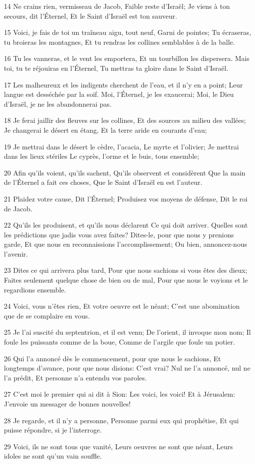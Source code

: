 \par 14 Ne crains rien, vermisseau de Jacob, Faible reste d'Israël; Je viens à ton secours, dit l'Éternel, Et le Saint d'Israël est ton sauveur.
\par 15 Voici, je fais de toi un traîneau aigu, tout neuf, Garni de pointes; Tu écraseras, tu broieras les montagnes, Et tu rendras les collines semblables à de la balle.
\par 16 Tu les vanneras, et le vent les emportera, Et un tourbillon les dispersera. Mais toi, tu te réjouiras en l'Éternel, Tu mettras ta gloire dans le Saint d'Israël.
\par 17 Les malheureux et les indigents cherchent de l'eau, et il n'y en a point; Leur langue est desséchée par la soif. Moi, l'Éternel, je les exaucerai; Moi, le Dieu d'Israël, je ne les abandonnerai pas.
\par 18 Je ferai jaillir des fleuves sur les collines, Et des sources au milieu des vallées; Je changerai le désert en étang, Et la terre aride en courants d'eau;
\par 19 Je mettrai dans le désert le cèdre, l'acacia, Le myrte et l'olivier; Je mettrai dans les lieux stériles Le cyprès, l'orme et le buis, tous ensemble;
\par 20 Afin qu'ils voient, qu'ils sachent, Qu'ils observent et considèrent Que la main de l'Éternel a fait ces choses, Que le Saint d'Israël en est l'auteur.
\par 21 Plaidez votre cause, Dit l'Éternel; Produisez vos moyens de défense, Dit le roi de Jacob.
\par 22 Qu'ils les produisent, et qu'ils nous déclarent Ce qui doit arriver. Quelles sont les prédictions que jadis vous avez faites? Dites-le, pour que nous y prenions garde, Et que nous en reconnaissions l'accomplissement; Ou bien, annoncez-nous l'avenir.
\par 23 Dites ce qui arrivera plus tard, Pour que nous sachions si vous êtes des dieux; Faites seulement quelque chose de bien ou de mal, Pour que nous le voyions et le regardions ensemble.
\par 24 Voici, vous n'êtes rien, Et votre oeuvre est le néant; C'est une abomination que de se complaire en vous.
\par 25 Je l'ai suscité du septentrion, et il est venu; De l'orient, il invoque mon nom; Il foule les puissants comme de la boue, Comme de l'argile que foule un potier.
\par 26 Qui l'a annoncé dès le commencement, pour que nous le sachions, Et longtemps d'avance, pour que nous disions: C'est vrai? Nul ne l'a annoncé, nul ne l'a prédit, Et personne n'a entendu vos paroles.
\par 27 C'est moi le premier qui ai dit à Sion: Les voici, les voici! Et à Jérusalem: J'envoie un messager de bonnes nouvelles!
\par 28 Je regarde, et il n'y a personne, Personne parmi eux qui prophétise, Et qui puisse répondre, si je l'interroge.
\par 29 Voici, ils ne sont tous que vanité, Leurs oeuvres ne sont que néant, Leurs idoles ne sont qu'un vain souffle.

